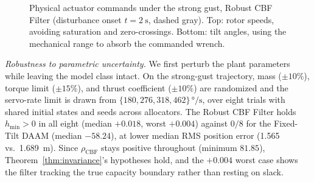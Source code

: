 \documentclass[letter, 10 pt, journal, twoside]{IEEEtran}
\theoremstyle{compact}
\begin{document}
\begin{figure}[tb]
    \vspace{-0.75em}
    \caption{\small Physical actuator commands under the strong gust, Robust \ac{CBF} Filter (disturbance onset $t=\SI{2}{\second}$, dashed gray). Top: rotor speeds, avoiding saturation and zero-crossings. Bottom: tilt angles, using the mechanical range to absorb the commanded wrench.}
    \label{fig:inputs}
    \vspace{-0.75em}
\end{figure}

%


\emph{Robustness to parametric uncertainty.} We first perturb the plant parameters while leaving the model class intact. On the strong-gust trajectory, mass ($\pm10\%$), torque limit ($\pm15\%$), and thrust coefficient ($\pm10\%$) are randomized and the servo-rate limit is drawn from $\{180,276,318,462\}\,\si{\degree\per\second}$, over eight trials with shared initial states and seeds across allocators. The Robust \ac{CBF} Filter holds $h_{\min}>0$ in all eight (median $+0.018$, worst $+0.004$) against $0/8$ for the Fixed-Tilt \ac{DAAM} (median $-58.24$), at lower median \ac{RMS} position error (\SI{1.565}{} vs.\ \SI{1.689}{\metre}). Since $\rho_{\mathrm{CBF}}$ stays positive throughout (minimum $81.85$), Theorem~\ref{thm:invariance}'s hypotheses hold, and the $+0.004$ worst case shows the filter tracking the true capacity boundary rather than resting on slack.
\end{document}
